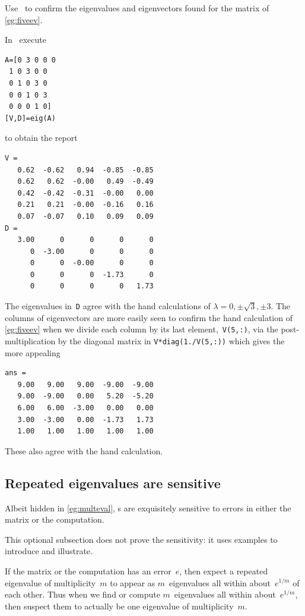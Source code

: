 \begin{example} \label{eg:fiveevm}
Use \script\ to confirm the eigenvalues and eigenvectors found for the matrix of \autoref{eg:fiveev}.
\begin{solution} 
In \script\ execute
\begin{verbatim}
A=[0 3 0 0 0
 1 0 3 0 0
 0 1 0 3 0
 0 0 1 0 3
 0 0 0 1 0]
[V,D]=eig(A)
\end{verbatim}
\setbox\ajrqrbox\hbox{}%
\marginpar{\usebox{\ajrqrbox}}%
to obtain the report \twodp
\begin{verbatim}
V =
   0.62  -0.62   0.94  -0.85  -0.85
   0.62   0.62  -0.00   0.49  -0.49
   0.42  -0.42  -0.31  -0.00   0.00
   0.21   0.21  -0.00  -0.16   0.16
   0.07  -0.07   0.10   0.09   0.09
D =
   3.00      0      0      0      0
      0  -3.00      0      0      0
      0      0  -0.00      0      0
      0      0      0  -1.73      0
      0      0      0      0   1.73
\end{verbatim}
The eigenvalues in~\verb|D| agree with the hand calculations of \(\lambda=0,\pm\sqrt3,\pm3\).
The columns of eigenvectors are more easily seen to confirm the hand calculation of \autoref{eg:fiveev} when we divide each column by its last element,~\verb|V(5,:)|, via the post-multiplication by the diagonal matrix in \verb|V*diag(1./V(5,:))| which gives the more appealing \twodp
\begin{verbatim}
ans =
   9.00   9.00   9.00  -9.00  -9.00
   9.00  -9.00   0.00   5.20  -5.20
   6.00   6.00  -3.00   0.00   0.00
   3.00  -3.00   0.00  -1.73   1.73
   1.00   1.00   1.00   1.00   1.00
\end{verbatim}
These also agree with the hand calculation.
\end{solution}
\end{example}







\subsection{Repeated eigenvalues are sensitive}
\label{sec:reas}



Albeit hidden in \autoref{eg:multeval}, s are exquisitely sensitive to errors in either the matrix or the computation.
\begin{aside}
This optional subsection does not prove the sensitivity: it uses examples to introduce and illustrate.
\end{aside}
If the matrix or the computation has an error~\(e\), then expect a repeated eigenvalue of multiplicity~\(m\) to appear as \(m\)~eigenvalues all within about~\(e^{1/m}\) of each other.
Thus when we find or compute \(m\)~eigenvalues all within about~\(e^{1/m}\), then suspect them to actually be one eigenvalue of multiplicity~\(m\).


